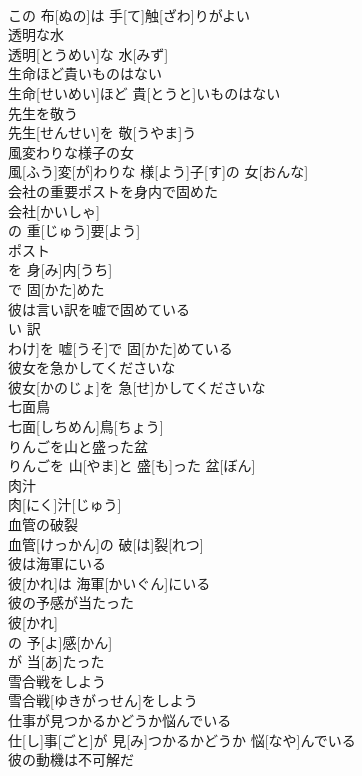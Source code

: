 \documentclass[8pt]{extreport}
\begin{document}
\begin{CJK}{UTF8}{min}
\\	この 布[ぬの]は 手[て]触[ざわ]りがよい
\\	透明な水	
\\	透明[とうめい]な 水[みず]
\\	生命ほど貴いものはない	
\\	生命[せいめい]ほど 貴[とうと]いものはない
\\	先生を敬う	
\\	先生[せんせい]を 敬[うやま]う
\\	風変わりな様子の女	
\\	風[ふう]変[が]わりな 様[よう]子[す]の 女[おんな]
\\	会社の重要ポストを身内で固めた	
\\	会社[かいしゃ]
\\	の 重[じゅう]要[よう]
\\	ポスト 
\\	を 身[み]内[うち]
\\	で 固[かた]めた 
\\	彼は言い訳を嘘で固めている	
\\	[彼は 言[い]い 訳
\\	わけ]を 嘘[うそ]で 固[かた]めている
\\	彼女を急かしてくださいな	
\\	彼女[かのじょ]を 急[せ]かしてくださいな
\\	七面鳥	
\\	七面[しちめん]鳥[ちょう]
\\	りんごを山と盛った盆	
\\	りんごを 山[やま]と 盛[も]った 盆[ぼん]
\\	肉汁	
\\	肉[にく]汁[じゅう]
\\	血管の破裂	
\\	血管[けっかん]の 破[は]裂[れつ]
\\	彼は海軍にいる	
\\	彼[かれ]は 海軍[かいぐん]にいる
\\	彼の予感が当たった	
\\	彼[かれ]
\\	の 予[よ]感[かん]
\\	が 当[あ]たった 
\\	雪合戦をしよう	
\\	雪合戦[ゆきがっせん]をしよう
\\	仕事が見つかるかどうか悩んでいる	
\\	仕[し]事[ごと]が 見[み]つかるかどうか 悩[なや]んでいる
\\	彼の動機は不可解だ	

\end{CJK}
\end{document}
